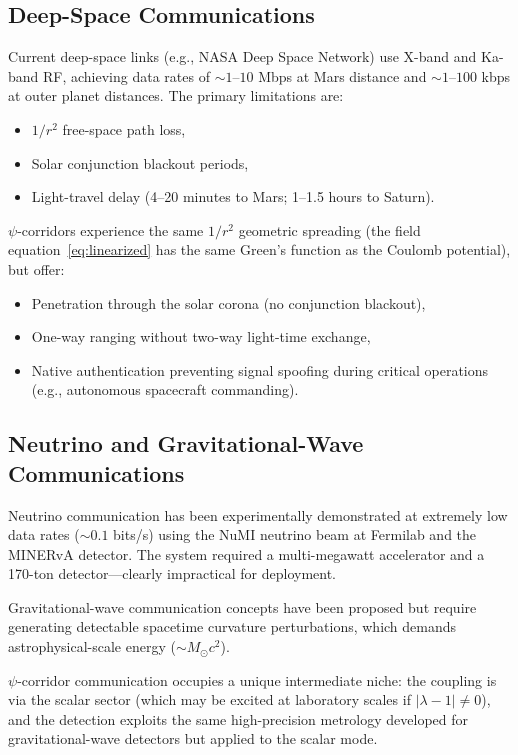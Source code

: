 \documentclass[twocolumn,superscriptaddress,prd,nofootinbib]{revtex4-2}
\begin{document}
\subsection{Deep-Space Communications}

Current deep-space links (e.g., NASA Deep Space Network) use X-band and
Ka-band RF, achieving data rates of $\sim 1$--$10$ Mbps at Mars
distance and $\sim 1$--$100$ kbps at outer planet distances.
The primary limitations are:
\begin{itemize}
\item $1/r^2$ free-space path loss,
\item Solar conjunction blackout periods,
\item Light-travel delay (4--20 minutes to Mars; 1--1.5 hours to Saturn).
\end{itemize}

$\psi$-corridors experience the same $1/r^2$ geometric spreading
(the field equation~\eqref{eq:linearized} has the same Green's function
as the Coulomb potential), but offer:
\begin{itemize}
\item Penetration through the solar corona (no conjunction blackout),
\item One-way ranging without two-way light-time exchange,
\item Native authentication preventing signal spoofing during critical
operations (e.g., autonomous spacecraft commanding).
\end{itemize}

\subsection{Neutrino and Gravitational-Wave Communications}

Neutrino communication has been experimentally demonstrated at extremely
low data rates ($\sim 0.1$ bits/s) using the NuMI neutrino beam at
Fermilab and the MINERvA detector.
The system required a multi-megawatt accelerator and a 170-ton
detector---clearly impractical for deployment.

Gravitational-wave communication concepts have been proposed but require
generating detectable spacetime curvature perturbations, which demands
astrophysical-scale energy ($\sim M_\odot c^2$).

$\psi$-corridor communication occupies a unique intermediate niche:
the coupling is via the scalar sector (which may be excited at laboratory
scales if $|\lambda - 1| \neq 0$), and the detection exploits the
same high-precision metrology developed for gravitational-wave detectors
but applied to the scalar mode.
\end{document}
